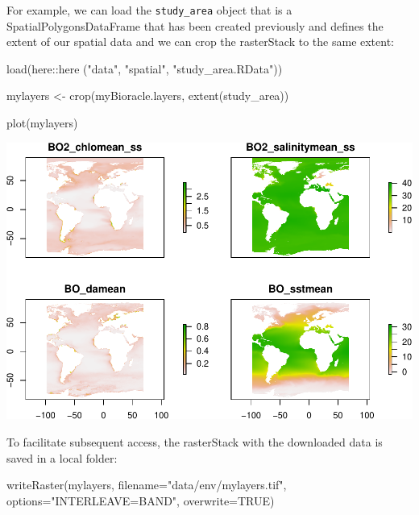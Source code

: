 \documentclass[
]{book}
\newenvironment{Shaded}{\begin{snugshade}}{\end{snugshade}}
\newcommand{\AttributeTok}[1]{\textcolor[rgb]{0.77,0.63,0.00}{#1}}
\newcommand{\ConstantTok}[1]{\textcolor[rgb]{0.00,0.00,0.00}{#1}}
\newcommand{\FunctionTok}[1]{\textcolor[rgb]{0.00,0.00,0.00}{#1}}
\newcommand{\NormalTok}[1]{#1}
\newcommand{\OtherTok}[1]{\textcolor[rgb]{0.56,0.35,0.01}{#1}}
\newcommand{\SpecialCharTok}[1]{\textcolor[rgb]{0.00,0.00,0.00}{#1}}
\newcommand{\StringTok}[1]{\textcolor[rgb]{0.31,0.60,0.02}{#1}}
\begin{document}
For example, we can load the \texttt{study\_area} object that is a SpatialPolygonsDataFrame that has been created previously and defines the extent of our spatial data and we can crop the rasterStack to the same extent:

\begin{Shaded}
\begin{Highlighting}[]
\FunctionTok{load}\NormalTok{(here}\SpecialCharTok{::}\FunctionTok{here}\NormalTok{ (}\StringTok{"data"}\NormalTok{, }\StringTok{"spatial"}\NormalTok{, }\StringTok{"study\_area.RData"}\NormalTok{))}

\NormalTok{mylayers }\OtherTok{\textless{}{-}} \FunctionTok{crop}\NormalTok{(myBioracle.layers, }\FunctionTok{extent}\NormalTok{(study\_area))}

\FunctionTok{plot}\NormalTok{(mylayers)}
\end{Highlighting}
\end{Shaded}

\includegraphics{_main_files/figure-latex/unnamed-chunk-36-1.pdf}

To facilitate subsequent access, the rasterStack with the downloaded data is saved in a local folder:

\begin{Shaded}
\begin{Highlighting}[]
\FunctionTok{writeRaster}\NormalTok{(mylayers, }\AttributeTok{filename=}\StringTok{"data/env/mylayers.tif"}\NormalTok{, }\AttributeTok{options=}\StringTok{"INTERLEAVE=BAND"}\NormalTok{, }\AttributeTok{overwrite=}\ConstantTok{TRUE}\NormalTok{)}
\end{Highlighting}
\end{Shaded}
\end{document}
